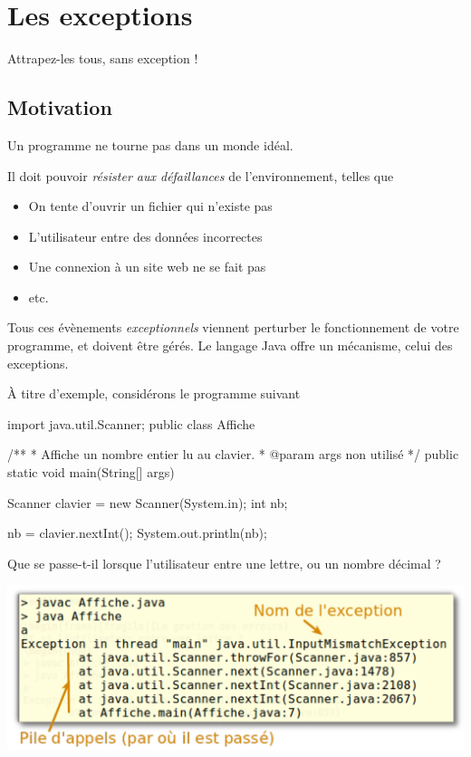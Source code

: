 \renewcommand{\chaptername}{Errata}
\chapter{Les exceptions}
\label{chap:exceptions}

\begin{Exergue}
	\og{}Attrapez-les tous, sans exception !\fg{}
\end{Exergue}

\minitoc

\section{Motivation}
Un programme ne tourne pas dans un monde idéal.

Il doit pouvoir \emph{résister aux défaillances} de l'environnement, telles que
  \begin{itemize}
  \item On tente d'ouvrir un fichier qui n'existe pas
  \item L'utilisateur entre des données incorrectes
  \item Une connexion à un site web ne se fait pas
  \item etc.
  \end{itemize}

  Tous ces évènements \emph{exceptionnels} viennent perturber le fonctionnement de votre programme, et doivent être gérés. Le langage Java offre un mécanisme, celui des exceptions.

À titre d'exemple, considérons le programme suivant

\begin{java}
import java.util.Scanner;
public class Affiche {
  /**
   * Affiche un nombre entier lu au clavier.
   * @param args non utilisé
   */
  public static void main(String[] args) {
      Scanner clavier = new Scanner(System.in);
      int nb;
 
      nb = clavier.nextInt();
      System.out.println(nb);
  }
}
\end{java}

Que se passe-t-il lorsque l'utilisateur entre une lettre, ou un nombre décimal ?

\begin{center}
\includegraphics[scale=0.65]{images/exception-InputMismatchException.pdf}
\end{center}

